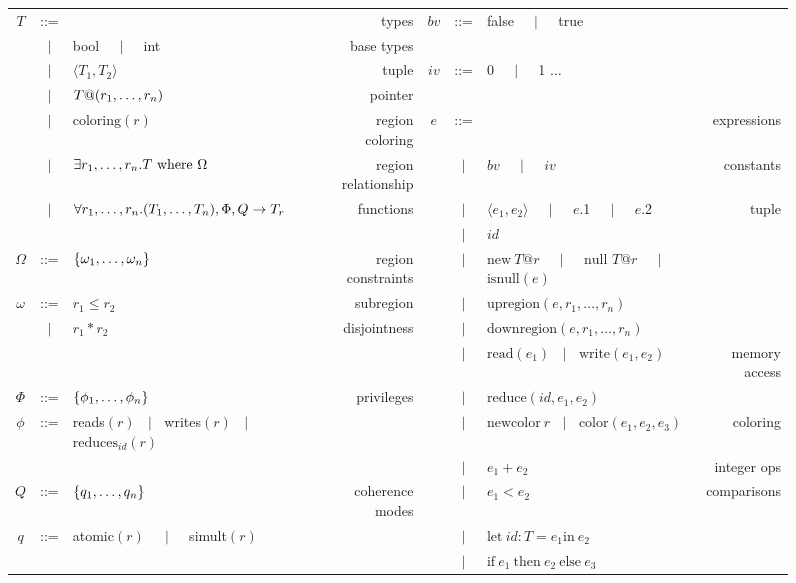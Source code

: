 \begin{figure*}
\centering
{\small
\begin{tabular}{cclr|cclr}

$T$ & ::= &  & types & $bv$ & ::= & false $\;\;\;\mid\;\;\;$ true & \\
  &$\mid$& bool $\;\;\;\mid\;\;\;$ int & base types & & & & \\
  &$\mid$& $\langle T_1, T_2 \rangle$ & tuple & $iv$ & ::= & 0 $\;\;\;\mid\;\;\;$ 1 $\ldots$ & \\
  &$\mid$& $T@({r}_1,\ldots,{r}_n)$ & pointer & & & & \\
  &$\mid$& $\text{coloring}(r)$ & region coloring & $e$ & ::= & & expressions \\
  &$\mid$& $\exists {r}_1,\ldots,{r}_n. T\text{ where }\Omega$ & region relationship &   &$\mid$& $bv$ $\;\;\;\mid\;\;\;$ $iv$ & constants \\
  &$\mid$& $\forall {r}_1,\ldots,{r}_n. ({T}_1,\ldots,{T}_n), \Phi, Q \rightarrow T_r$ & functions &   &$\mid$& $\langle e_1, e_2 \rangle$ $\;\;\;\mid\;\;\;$ $e$.1 $\;\;\;\mid\;\;\;$ $e$.2 & tuple \\
& & & &   &$\mid$& $id$ &  \\
$\Omega$ & ::= & $\{ {\omega}_1,\ldots,{\omega}_n \}$ & region constraints &   &$\mid$& $\text{new}\ T@r$ $\;\;\;\mid\;\;\;$ $\text{null }T@r$ $\;\;\;\mid\;\;\;$ $\text{isnull}(e)$ & \\
$\omega$ & ::= & $r_1 \leq r_2$ & subregion   &   
  &$\mid$& $\text{upregion}(e, r_1,\ldots,r_n)$ & \\
  &$\mid$& $r_1 * r_2$ & disjointness &   
  &$\mid$ & $\text{downregion}(e, r_1,\ldots,r_n)$ & \\  
& & &  & 
  &$\mid$& $\text{read}(e_1)$ $\;\mid\;$ $\text{write}(e_1, e_2)$ & memory access \\
$\Phi$ & ::= & $\{ {\phi}_1,\ldots,{\phi}_n \}$ & privileges & 
  & $\mid$ & $\text{reduce}(id, e_1, e_2)$ & \\
$\phi$ & ::= & reads$(r)$ $\;\mid\;$ writes$(r)$ $\;\mid\;$ $\text{reduces}_{id}(r)$ &  &  
  &$\mid$& $\text{newcolor}\ r$ $\;\mid\;$ $\text{color}(e_1, e_2, e_3)$ & coloring \\
& & & &  
  &   $\mid$& $e_1 + e_2$ & integer ops \\
$Q$ & ::= & $\{ {q}_1,\ldots,{q}_n \}$ & coherence modes  &   
       & $\mid$& $e_1 < e_2$ & comparisons \\
$q$ & ::= & atomic$(r)$ $\;\;\;\mid\;\;\;$ simult$(r)$ & &   
  &$\mid$& $\text{let}\ id : T = e_1 \text{in}\ e_2$ &  \\
& & & &   
       & $\mid$& $\text{if}\ e_1\ \text{then}\ e_2\ \text{else}\ e_3$ &  \\

\end{tabular}}
\end{figure*}
